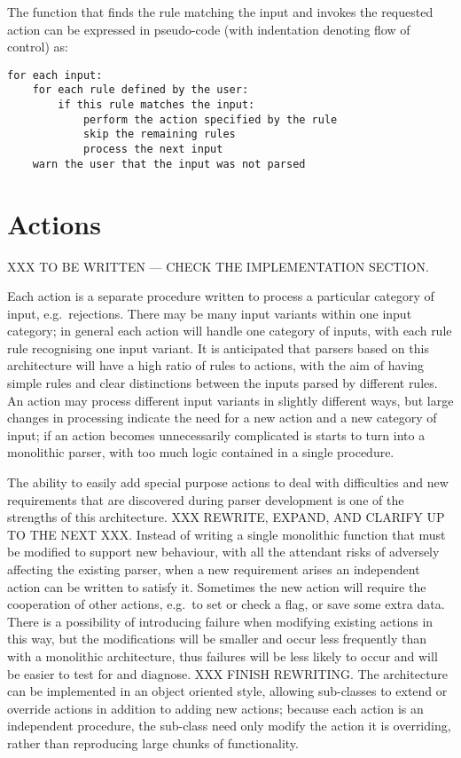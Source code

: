 The function that finds the rule matching the input and invokes the
requested action can be expressed in pseudo-code (with indentation denoting
flow of control) as:

\begin{verbatim}
for each input:
    for each rule defined by the user:
        if this rule matches the input:
            perform the action specified by the rule
            skip the remaining rules
            process the next input
    warn the user that the input was not parsed
\end{verbatim}

\section{Actions}

\label{actions in architecture}

XXX TO BE WRITTEN --- CHECK THE IMPLEMENTATION SECTION\@.

Each action is a separate procedure written to process a particular
category of input, e.g.\ rejections.  There may be many input variants
within one input category; in general each action will handle one category
of inputs, with each rule rule recognising one input variant.  It is
anticipated that parsers based on this architecture will have a high ratio
of rules to actions, with the aim of having simple rules and clear
distinctions between the inputs parsed by different rules.  An action may
process different input variants in slightly different ways, but large
changes in processing indicate the need for a new action and a new category
of input; if an action becomes unnecessarily complicated is starts to turn
into a monolithic parser, with too much logic contained in a single
procedure.

The ability to easily add special purpose actions to deal with difficulties
and new requirements that are discovered during parser development is one
of the strengths of this architecture.  XXX REWRITE, EXPAND, AND CLARIFY UP
TO THE NEXT XXX\@.  Instead of writing a single monolithic function that
must be modified to support new behaviour, with all the attendant risks of
adversely affecting the existing parser, when a new requirement arises an
independent action can be written to satisfy it.  Sometimes the new action
will require the cooperation of other actions, e.g.\ to set or check a
flag, or save some extra data.  There is a possibility of introducing
failure when modifying existing actions in this way, but the modifications
will be smaller and occur less frequently than with a monolithic
architecture, thus failures will be less likely to occur and will be easier
to test for and diagnose.  XXX FINISH REWRITING\@.  The architecture can be
implemented in an object oriented style, allowing sub-classes to extend or
override actions in addition to adding new actions; because each action is
an independent procedure, the sub-class need only modify the action it is
overriding, rather than reproducing large chunks of functionality.

